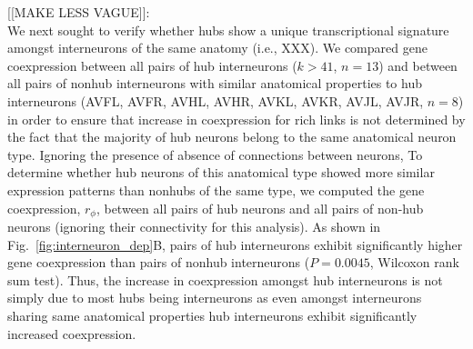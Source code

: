 \documentclass[10pt,letterpaper]{article}
\begin{document}
[[MAKE LESS VAGUE]]:\\
We next sought to verify whether hubs show a unique transcriptional signature amongst interneurons of the same anatomy (i.e., XXX).
We compared gene coexpression between all pairs of hub interneurons ($\textit{k}>41$, $n=13$) and between all pairs of nonhub interneurons with similar anatomical properties to hub interneurons (AVFL, AVFR, AVHL, AVHR, AVKL, AVKR, AVJL, AVJR, $n=8$) in order to ensure that increase in coexpression for rich links is not determined by the fact that the majority of hub neurons belong to the same anatomical neuron type.
Ignoring the presence of absence of connections between neurons,
To determine whether hub neurons of this anatomical type showed more similar expression patterns than nonhubs of the same type, we computed the gene coexpression, $r_\phi$, between all pairs of hub neurons and all pairs of non-hub neurons (ignoring their connectivity for this analysis).
As shown in Fig.~\ref{fig:interneuron_dep}B, pairs of hub interneurons exhibit significantly higher gene coexpression than pairs of nonhub interneurons ($P = 0.0045$, Wilcoxon rank sum test).
Thus, the increase in coexpression amongst hub interneurons is not simply due to most hubs being interneurons as even amongst interneurons sharing same anatomical properties hub interneurons exhibit significantly increased coexpression.
\end{document}
